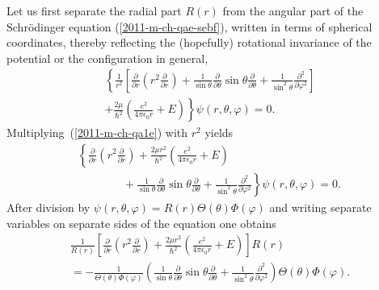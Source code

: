 Let us first separate
the radial part $R(r)$ from the angular part of the Schr\"odinger equation (\ref{2011-m-ch-qae-sebf}),
written in terms of spherical coordinates, thereby reflecting the (hopefully) rotational invariance
of the potential
or the configuration in general,
\begin{equation}
\begin{split}
\left\{
\frac{1}{r^2} \left[ \frac{\partial}{\partial r}\left( r^2\frac{\partial}{\partial r}\right)
+
\frac{1}{\sin \theta}   \frac{\partial}{\partial \theta }
\sin \theta \frac{\partial}{\partial \theta }
+
\frac{1}{\sin^2 \theta} \frac{\partial^2}{\partial \varphi^2 }
\right]
\right.    \\
+
\left.
\frac{2\mu }{\hslash^2} \left(\frac{e^2}{4\pi \epsilon_0 r} + E \right)\right\}
\psi (r, \theta ,\varphi  )=0
.
\end{split}
\label{2011-m-ch-qa1e}
\end{equation}
Multiplying~(\ref{2011-m-ch-qa1e}) with $r^2$ yields
\begin{equation}
\begin{split}
\left\{  \frac{\partial}{\partial r}\left( r^2\frac{\partial}{\partial r}\right) +
\frac{2\mu r^2}{\hslash^2} \left(\frac{e^2}{4\pi \epsilon_0 r} + E \right) \right. \qquad  \qquad \qquad \qquad \qquad\\
\qquad  \qquad +  \left.
\frac{1}{\sin \theta}   \frac{\partial}{\partial \theta }
\sin \theta \frac{\partial}{\partial \theta }
+
\frac{1}{\sin^2 \theta} \frac{\partial^2}{\partial \varphi^2 }
\right\}
\psi (r, \theta ,\varphi  )=0
.
\end{split}
\label{2011-m-ch-qae2}
\end{equation}
After division by $\psi (r, \theta ,\varphi  )= R(r)\Theta(\theta)\Phi(\varphi)$
and writing separate variables on separate sides of the equation one obtains
\begin{equation}
\begin{split}
\frac{1}{R( r )}
\left[  \frac{\partial}{\partial r}\left( r^2\frac{\partial}{\partial r}\right) +
\frac{2\mu r^2}{\hslash^2} \left(\frac{e^2}{4\pi \epsilon_0 r} + E \right) \right] R(r)
\qquad
\\  =
-\frac{1}{\Theta(\theta)\Phi(\varphi)} \left(
\frac{1}{\sin \theta}   \frac{\partial}{\partial \theta }
\sin \theta \frac{\partial}{\partial \theta }
+
\frac{1}{\sin^2 \theta} \frac{\partial^2}{\partial \varphi^2 }
\right)
\Theta(\theta)\Phi(\varphi)
.
\end{split}
\label{2011-m-ch-qae3}
\end{equation}
